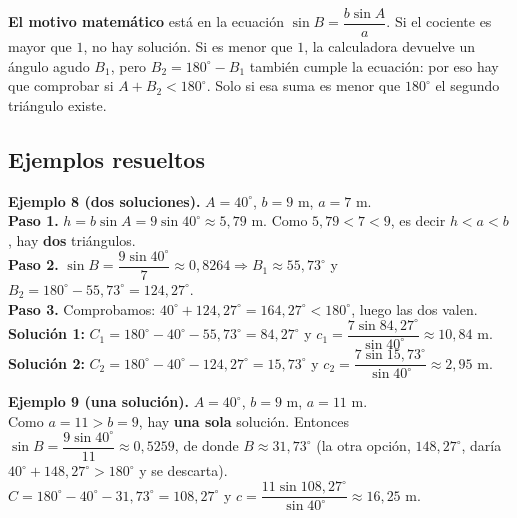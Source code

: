 \documentclass[12pt, letterpaper]{article}
\providecommand{\sen}{\sin}
\begin{document}
\begin{cuadroadvertencia}
  \small
  \textbf{El motivo matemático} está en la ecuación
  $\sen B=\dfrac{b\sen A}{a}$. Si el cociente es mayor que $1$, no hay
  solución. Si es menor que $1$, la calculadora devuelve un ángulo agudo
  $B_1$, pero $B_2=180^{\circ}-B_1$ también cumple la ecuación: por eso hay
  que comprobar si $A+B_2<180^{\circ}$. Solo si esa suma es menor que
  $180^{\circ}$ el segundo triángulo existe.
\end{cuadroadvertencia}

\subsection*{Ejemplos resueltos}

\begin{cuadrosolucion}
  \small
  \textbf{Ejemplo 8 (dos soluciones).} $A=40^{\circ}$, $b=9$ m, $a=7$ m.
  \\[2pt]
  \textbf{Paso 1.} $h=b\sen A=9\sen 40^{\circ}\approx 5{,}79$ m. Como
  $5{,}79<7<9$, es decir $h<a<b$, hay \textbf{dos} triángulos.\\[2pt]
  \textbf{Paso 2.}
  $\sen B=\dfrac{9\sen 40^{\circ}}{7}\approx 0{,}8264
  \Rightarrow B_1\approx 55{,}73^{\circ}$ y
  $B_2=180^{\circ}-55{,}73^{\circ}=124{,}27^{\circ}$.\\[2pt]
  \textbf{Paso 3.} Comprobamos: $40^{\circ}+124{,}27^{\circ}=164{,}27^{\circ}
  <180^{\circ}$, luego las dos valen.\\[2pt]
  \textbf{Solución 1:} $C_1=180^{\circ}-40^{\circ}-55{,}73^{\circ}=84{,}27^{\circ}$
  y $c_1=\dfrac{7\sen 84{,}27^{\circ}}{\sen 40^{\circ}}\approx 10{,}84$ m.\\[2pt]
  \textbf{Solución 2:} $C_2=180^{\circ}-40^{\circ}-124{,}27^{\circ}=15{,}73^{\circ}$
  y $c_2=\dfrac{7\sen 15{,}73^{\circ}}{\sen 40^{\circ}}\approx 2{,}95$ m.
\end{cuadrosolucion}

\begin{cuadrosolucion}
  \small
  \textbf{Ejemplo 9 (una solución).} $A=40^{\circ}$, $b=9$ m, $a=11$ m.
  \\[2pt]
  Como $a=11>b=9$, hay \textbf{una sola} solución. Entonces
  $\sen B=\dfrac{9\sen 40^{\circ}}{11}\approx 0{,}5259$, de donde
  $B\approx 31{,}73^{\circ}$ (la otra opción, $148{,}27^{\circ}$, daría
  $40^{\circ}+148{,}27^{\circ}>180^{\circ}$ y se descarta).\\[2pt]
  $C=180^{\circ}-40^{\circ}-31{,}73^{\circ}=108{,}27^{\circ}$ y
  $c=\dfrac{11\sen 108{,}27^{\circ}}{\sen 40^{\circ}}\approx 16{,}25$ m.
\end{cuadrosolucion}
\end{document}
